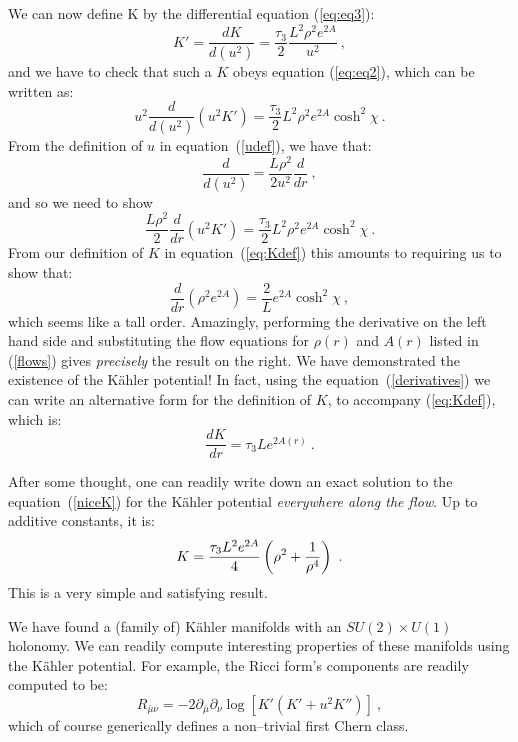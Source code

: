 \documentclass[a4paper,12pt]{article}
\newcommand{\labell}[1]{\label{#1}}
\newcommand{\reef}[1]{(\ref{#1})}
\begin{document}
We can now define K by the differential equation (\ref{eq:eq3}):
\begin{equation}
  K'=\frac{dK}{d(u^2)} = \frac{\tau_3}{2} \frac{L^2 \rho^2 e^{2A}}{u^2}\ ,
  \labell{eq:Kdef}
\end{equation}
and we have to check that such a $K$ obeys equation (\ref{eq:eq2}),
which can be written as:
\begin{equation}
  u^2 \frac{d}{d(u^2)} (u^2 K') = 
\frac{\tau_3}{2} L^2 \rho^2 e^{2A} \cosh^2 \chi\ .
\end{equation}
{}From the definition of $u$ in equation~\reef{udef}, we have that:
\begin{equation}
  \frac{d}{d(u^2)} = \frac{L \rho^2}{2 u^2} \frac{d}{dr}\ ,
  \labell{derivatives}
\end{equation}
and so we need to show
\begin{equation}
  \frac{L \rho^2}{2} \frac{d}{dr} (u^2 K') 
= \frac{\tau_3}{2} L^2 \rho^2 e^{2A} \cosh^2 \chi\ .
  \labell{eq:toprove}
\end{equation}
{}From our definition of $K$ in equation~(\ref{eq:Kdef}) this amounts to
requiring us to show that:
\begin{equation}
  \frac{d}{dr} ( \rho^2 e^{2A}) =  \frac{2}{L }  e^{2A} \cosh^2 \chi\ ,
\end{equation}
which seems like a tall order.  Amazingly, performing the derivative
on the left hand side and substituting the flow equations for
$\rho(r)$ and $A(r)$ listed in \reef{flows} gives {\it precisely} the
result on the right. We have demonstrated the existence of the
K\"ahler potential! In fact, using the equation~\reef{derivatives} we
can write an alternative form for the definition of $K$, to accompany
\reef{eq:Kdef}, which is:
\begin{equation}
  \frac{dK}{dr}={\tau_3}{L}e^{2A(r)}\ .
  \labell{niceK}
\end{equation}


After some thought, one can readily write down an exact solution to
the equation~\reef{niceK} for the K\"ahler potential {\it everywhere
  along the flow}. Up to additive constants, it is:
\begin{equation}
K = { \tau_3 L^2 e^{2A}  \over 4} \left(\rho^2  + {1\over\rho^{4}}\right)\ .
\labell{exactK}
\end{equation}
This is a very simple and satisfying result. 


We have found a (family of) K\"ahler manifolds with an $SU(2)\times
U(1)$ holonomy. We can readily compute interesting properties of these
manifolds using the K\"ahler potential. For example, the Ricci form's
components are readily computed to be:
\begin{equation}
R_{{\bar\mu}\nu}=
-2\partial_{\bar\mu}\partial_{\nu}\log\left[K'(K'+u^2K'')\right]\ ,
\end{equation}
which of course generically defines a non--trivial first Chern class.
\end{document}
